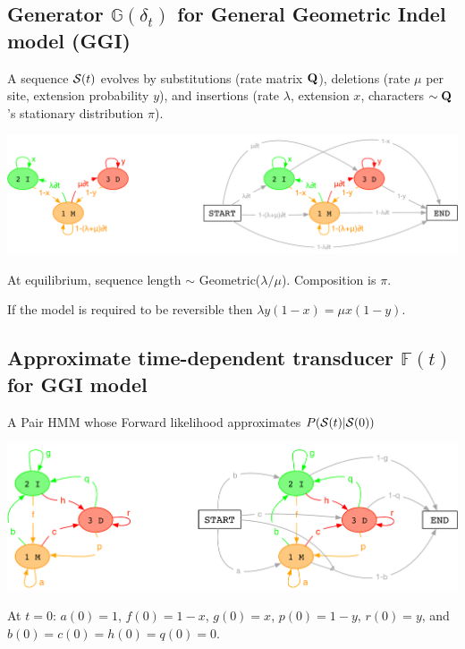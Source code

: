 \documentclass{article}
\begin{document}
\subsection{Generator $\mathbb{G}(\delta_t)$ for General Geometric Indel model (GGI)}

A sequence ${\cal S}(t)$ evolves by
substitutions (rate matrix ${\bf Q}$),
deletions (rate $\mu$ per site, extension probability $y$),
and
insertions (rate $\lambda$, extension $x$,
characters $\sim {\bf Q}$'s stationary distribution $\pi$).

\includegraphics[width=\textwidth]{InstantHMM.pdf}

At equilibrium, sequence length $\sim$ Geometric($\lambda/\mu$). Composition is $\pi$.

If the model is required to be reversible then $\lambda y(1-x) = \mu x(1-y)$.

\subsection{Approximate time-dependent transducer $\mathbb{F}(t)$ for GGI model}

A Pair HMM whose Forward likelihood approximates $P({\cal S}(t)|{\cal S}(0))$

\includegraphics[width=\textwidth]{PairHMM.pdf}

At $t=0$: $a(0)=1$, $f(0)=1-x$, $g(0)=x$, $p(0)=1-y$, $r(0)=y$, and $b(0)=c(0)=h(0)=q(0)=0$.
\end{document}
